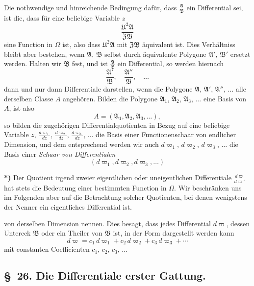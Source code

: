 \documentclass{article}
\begin{document}
Die nothwendige und hinreichende Bedingung dafür, dass $\frac{\mathfrak{A}}{\mathfrak{B}}$ ein Differential sei, ist die, dass für eine beliebige Variable $z$
\[ \frac{\mathfrak{U}^{2}\mathfrak{A}}{\mathfrak{Z}\mathfrak{B}} \]
eine Function in $\Omega$ ist, also dass $\mathfrak{U}^{2}\mathfrak{A}$ mit $\mathfrak{Z}\mathfrak{B}$ äquivalent ist. Dies Verhältniss bleibt aber bestehen, wenn $\mathfrak{A}$, $\mathfrak{B}$ selbst durch äquivalente Polygone $\mathfrak{A}'$, $\mathfrak{B}'$ ersetzt werden. Halten wir $\mathfrak{B}$ fest, und ist $\frac{\mathfrak{A}}{\mathfrak{B}}$ ein Differential, so werden hiernach
\[ \frac{\mathfrak{A}'}{\mathfrak{B}}, \quad \frac{\mathfrak{A}''}{\mathfrak{B}}, \quad \ldots \]
dann und nur dann Differentiale darstellen, wenn die Polygone $\mathfrak{A}$, $\mathfrak{A}'$, $\mathfrak{A}''$, $\ldots$ alle derselben Classe $A$ angehören. Bilden die Polygone $\mathfrak{A}_{1}$, $\mathfrak{A}_{2}$, $\mathfrak{A}_{3}$, $\ldots$ eine Basis von $A$, ist also
\[ A = (\mathfrak{A}_{1}, \mathfrak{A}_{2}, \mathfrak{A}_{3}, \ldots), \]
so bilden die zugehörigen Differentialquotienten in Bezug auf eine beliebige Variable $z$, $\frac{d\varpi_{1}}{dz}$, $\frac{d\varpi_{2}}{dz}$, $\frac{d\varpi_{3}}{dz}$, $\ldots$ die Basis einer Functionenschaar von endlicher Dimension, und dem entsprechend werden wir auch $d\varpi_{1}$, $d\varpi_{2}$, $d\varpi_{3}$, $\ldots$ die Basis einer \emph{Schaar von Differentialen}
\[ (d\varpi_{1}, d\varpi_{2}, d\varpi_{3}, \ldots) \]

\textbf{*)} Der Quotient irgend zweier eigentlichen oder uneigentlichen Differentiale $\frac{d\varpi}{d\varpi'}$ hat stets die Bedeutung einer bestimmten Function in $\Omega$. Wir beschränken uns im Folgenden aber auf die Betrachtung solcher Quotienten, bei denen wenigstens der Nenner ein eigentliches Differential ist.

von derselben Dimension nennen. Dies besagt, dass jedes Differential $d\varpi$, dessen Untereck $\mathfrak{B}$ oder ein Theiler von $\mathfrak{B}$ ist, in der Form dargestellt werden kann
\[ d\varpi = c_{1}\,d\varpi_{1} + c_{2}\,d\varpi_{2} + c_{3}\,d\varpi_{3} + \cdots \]
mit constanten Coefficienten $c_{1}$, $c_{2}$, $c_{3}$, $\ldots$

\subsection*{§~26. Die Differentiale erster Gattung.}
\end{document}
